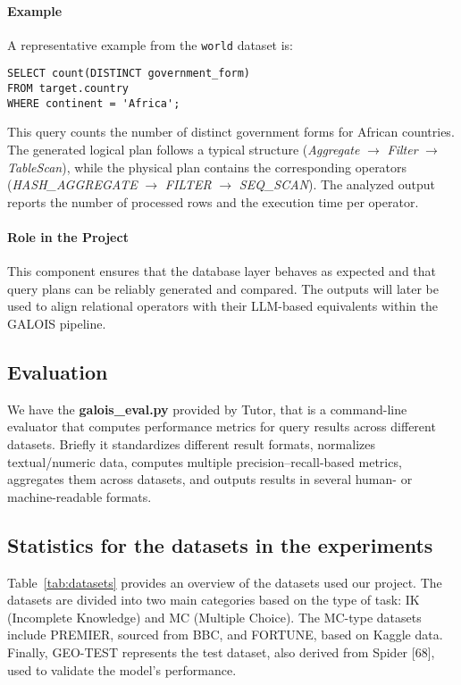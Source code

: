 \documentclass[12pt,a4paper]{article}
\begin{document}
\paragraph{Example}
A representative example from the \texttt{world} dataset is:
\begin{verbatim}
SELECT count(DISTINCT government_form)
FROM target.country
WHERE continent = 'Africa';
\end{verbatim}

This query counts the number of distinct government forms for African countries.
The generated logical plan follows a typical structure
(\emph{Aggregate} $\rightarrow$ \emph{Filter} $\rightarrow$ \emph{TableScan}),
while the physical plan contains the corresponding operators
(\emph{HASH\_AGGREGATE} $\rightarrow$ \emph{FILTER} $\rightarrow$
\emph{SEQ\_SCAN}). The analyzed output reports the number of processed rows and
the execution time per operator.

\paragraph{Role in the Project}
This component ensures that the database layer behaves as expected and that
query plans can be reliably generated and compared. The outputs will later be
used to align relational operators with their LLM-based equivalents within the
GALOIS pipeline.


\subsection{Evaluation}
We have the \textbf{galois\_eval.py} provided by Tutor, that is a command-line evaluator that computes performance metrics for query results across different datasets.
Briefly it standardizes different result formats, normalizes textual/numeric data, computes multiple precision–recall-based metrics, aggregates them across datasets, and outputs results in several human- or machine-readable formats.

\subsection{Statistics for the datasets in the experiments}
Table~\ref{tab:datasets} provides an overview of the datasets used our project. The datasets are divided into two main categories based on the type of task: IK (Incomplete Knowledge) and MC (Multiple Choice).
The MC-type datasets include PREMIER, sourced from BBC, and FORTUNE, based on Kaggle data.
Finally, GEO-TEST represents the test dataset, also derived from Spider [68], used to validate the model's performance.
\end{document}
